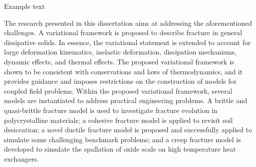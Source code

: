 \abstract

Example text

The research presented in this dissertation aims at addressing
the aforementioned challenges. A variational framework is proposed 
to describe fracture in general dissipative solids. In essence, 
the variational statement is extended to account for large deformation
kinematics, inelastic deformation, dissipation mechanisms, dynamic 
effects, and thermal effects. The proposed variational framework
is shown to be consistent with conservations and laws of 
thermodynamics, and it provides guidance and imposes restrictions
on the construction of models for coupled field problems. Within 
the proposed variational framework, several models are instantiated 
to address practical engineering problems. A brittle and quasi-brittle
fracture model is used to investigate fracture evolution in 
polycrystalline materials; a cohesive fracture model is applied 
to revisit soil desiccation; a novel ductile fracture model is 
proposed and successfully applied to simulate some challenging 
benchmark problems; and a creep fracture model is developed to
simulate the spallation of oxide scale on high temperature heat
exchangers.
